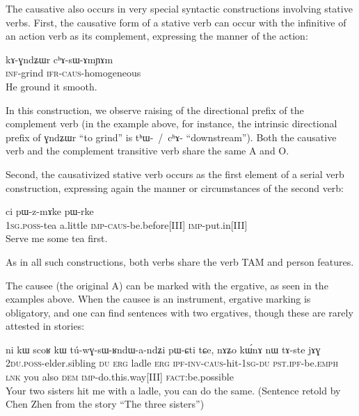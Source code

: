\documentclass[oldfontcommands,oneside,a4paper,11pt]{article}
\newcommand{\ipa}[1]{{\phon \mbox{#1}}} %
\newcommand{\sg}{\textsc{sg}}
\newcommand{\jg}[1]{\ipa{#1}\index{Japhug #1}}
\newcommand{\wav}[1]{}%
\newcommand{\caus}{\textsc{caus}}
\newcommand{\lnk}{\textsc{lnk}}
\newcommand{\dem}{\textsc{dem}}
\newcommand{\du}{\textsc{du}}
\newcommand{\erg}{\textsc{erg}}
\newcommand{\emphat}{\textsc{emph}}
\newcommand{\evd}{\textsc{ifr}}
\newcommand{\imp}{\textsc{imp}}
\newcommand{\inftv}{\textsc{inf}}
\newcommand{\inv}{\textsc{inv}}
\newcommand{\ipf}{\textsc{ipf}}
\newcommand{\fact}{\textsc{fact}}
\newcommand{\poss}{\textsc{poss}}
\newcommand{\pst}{\textsc{pst}}
\begin{document}
The causative also occurs in very special syntactic constructions involving stative verbs. First, the causative form of a stative verb can occur with the infinitive of an action verb as its complement, expressing the manner of the action:
\begin{exe}
\ex
\gll 
 \ipa{kɤ-ɣndʑɯr} 	\ipa{cʰɤ-sɯ-ɤmɲɤm}  \\
 \inftv{}-grind \evd{}-\caus{}-homogeneous \\
 \glt  He ground it smooth.
\end{exe} 

In this construction, we observe raising of the directional prefix of the complement verb (in the example above, for instance, the intrinsic directional prefix of \jg{ɣndʑɯr} ``to grind'' is \ipa{tʰɯ- / cʰɤ-} ``downstream''). Both the causative verb and the complement transitive verb share the same A and O.

Second, the causativized stative verb occurs as the first element of a serial verb construction, expressing again the manner or circumstances of the second verb:

\begin{exe}
\ex
\gll \ipa{a-tʂʰa} 	\ipa{ci} 	\ipa{pɯ-z-mɤke} 	\ipa{pɯ-rke} \\
1\sg{}.\poss{}-tea a.little \imp{}-\caus{}-be.before[III] \imp{}-put.in[III] \\
\glt  Serve me some tea first.
\end{exe} 
As in all such constructions, both verbs share the verb TAM and person features.

 
The causee (the original A) can be marked with the ergative, as seen in the examples above. When the causee is an instrument, ergative marking is obligatory, and one can find sentences with two ergatives, though these are rarely attested in stories:
\begin{exe}
\ex
\gll \ipa{nɤ-pi} 	\ipa{ni} 	\ipa{kɯ} 	\ipa{scoʁ} 	\ipa{kɯ} 	\ipa{tú-wɣ-sɯ-ʁndɯ-a-ndʑi} 	\ipa{pɯ-ɕti} 	\ipa{tɕe,} 	\ipa{nɤʑo} 	\ipa{kɯ́nɤ} 	\ipa{nɯ} 	\ipa{tɤ-ste} 	\ipa{jɤɣ}  \\
2\du{}.\poss{}-elder.sibling \du{} \erg{} ladle \erg{} \ipf{}-\inv{}-\caus{}-hit-1\sg{}-\du{} \pst{}.\ipf{}-be.\emphat{} \lnk{} you also \dem{} \imp{}-do.this.way[III] \fact{}:be.possible  \\
\glt   Your two sisters hit me with a ladle, you can do the same. (Sentence retold by Chen Zhen from the story ``The three sisters'') \wav{8_scoRkW}
\end{exe} 
\end{document}
